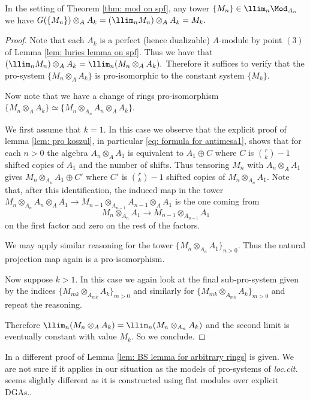 \documentclass[10pt,reqno]{amsart}
\numberwithin{equation}{section}
\begin{document}
\begin{lemma}\label{lem: BS lemma for arbitrary rings}
    In the setting of Theorem \ref{thm: mod on spf}, any tower $\{M_n\}\in \llim_n \Mod_{A_n}$ we have $G(\{M_n\})\otimes_A A_k=(\llim_n M_n)\otimes_A A_k=M_k.$
\end{lemma}
\begin{proof}
        Note that each $A_k$ is a perfect (hence dualizable) $A$-module by point $(3)$ of Lemma \ref{lem: luries lemma on spf}. 
    Thus we have that $(\llim_n M_n)\otimes_A A_k=\llim_n(M_n\otimes_A A_k).$ Therefore it suffices to verify that the pro-system $\{M_n\otimes_A A_k\}$ is pro-isomorphic to the constant system $\{M_k\}.$ 
    
    
    Now note that we have a change of rings pro-isomorphism $\{M_n\otimes_A A_k\}\simeq \{M_n\otimes_{A_n} A_n\otimes_A A_k\}.$  

    

    We first assume that $k=1.$ In this case we observe that the explicit proof of lemma \ref{lem: pro koszul}, in particular \ref{eq: formula for antimesa1}, shows that for each $n>0$ the algebra $A_n\otimes_A A_1$ is equivalent to $A_1\oplus C$ where $C$ is $\binom{r}{k}-1$ shifted copies of $A_1$ and the number of shifts. Thus tensoring $M_n$ with $A_n\otimes_A A_1$ gives $M_n\otimes_{A_n} A_1\oplus C'$ where $C'$ is  $\binom{r}{k}-1$ shifted copies of $M_n\otimes_{A_n} A_1$.
    Note that, after this identification, the induced map in the tower $M_n\otimes_{A_n} A_n\otimes_A A_1\to M_{n-1}\otimes_{A_{n-1}} A_{n-1}\otimes_A A_1 $ is the one coming from $$M_n\otimes_{A_n}A_1\to M_{n-1}\otimes_{A_{n-1}} A_1$$ on the first factor and zero on the rest of the factors. 

    We may apply similar reasoning for the tower $\{M_n\otimes_{A_n}A_1\}_{n>0}.$
    Thus the natural projection map again is a pro-isomorphism. 

    Now suppose $k>1$. In this case we again look at the final sub-pro-system given by the indices $\{M_{mk}\otimes_{A_{mk}}A_k\}_{m>0}$ and similarly for $\{M_{mk}\otimes_{A_{mk}}A_k\}_{m>0}$ and repeat the reasoning.
    

    
    Therefore $\llim_n (M_n\otimes_A A_k)=\llim_n(M_n\otimes_{A_n} A_k)$ and the second limit is eventually constant with value $M_k.$ So we conclude.
\end{proof}




\begin{remark}\label{remark: pro-iso stacksproject}
      In \cite[\href{https://stacks.math.columbia.edu/tag/0GZI}{Tag 0GZI}]{stacks-project} a different proof of Lemma \ref{lem: BS lemma for arbitrary rings} is given. We are not sure if it applies in our situation as the models of pro-systems of \emph{loc.cit.} seems slightly different as it is constructed using flat modules over explicit DGAs..
\end{remark}
\end{document}
